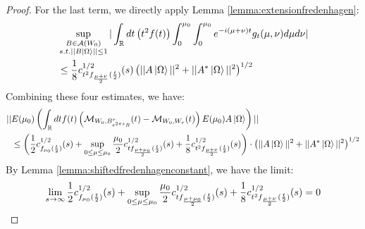 \documentclass[a4paper,11pt]{article}
\theoremstyle{definition}
\newcommand{\lb}{\left(}
\newcommand{\rb}{\right)}
\begin{document}
\begin{proof}
    For the last term, we directly apply Lemma \ref{lemma:extensionfredenhagen}:
    \begin{align}
        \begin{split}
            &\sup_{\substack{B\in\mathcal{A}(W_0)\\s.t.||B\ket{\Omega}||\leq 1}}|\int_\mathbb{R} dt \lb t^2f(t) \rb\int_0^{\mu_0}\int_0^{\mu_0}e^{-i(\mu + \nu)t}g_t(\mu,\nu)d\mu d\nu|
            \\&
            \leq \frac{1}{8}c_{t^2f_{\frac{\mu + \nu}{2}}(\frac{t}{2})}^{1/2}(s)\lb||A\ket{\Omega}||^2 + ||A^*\ket{\Omega}||^2\rb^{1/2}
        \end{split}
    \end{align}
    Combining these four estimates, we have:
    \begin{align}
        \begin{split}
            ||&E(\mu_0)\lb\int_\mathbb{R} dt f(t)\lb \mathcal{M}_{W_0, B^r_{e^{2\pi s}R}}(t) - \mathcal{M}_{W_0, W_r}(t) \rb E(\mu_0)A\ket{\Omega}\rb||
            \\&
            \leq \lb \frac{1}{2}c^{1/2}_{f_{\mu_0}(\frac{t}{2})}(s) + \sup_{0\leq\mu\leq\mu_0}\frac{\mu_0}{2} c^{1/2}_{tf_{\frac{\mu + \mu_0}{2}}(\frac{t}{2})}(s) + \frac{1}{8}c^{1/2}_{t^2f_{\frac{\mu + \nu}{2}}(\frac{t}{2})}(s)\rb\cdot\lb||A\ket{\Omega}||^2 + ||A^*\ket{\Omega}||^2\rb^{1/2}
        \end{split}
    \end{align}
    By Lemma \ref{lemma:shiftedfredenhagenconstant}, we have the limit:
    \begin{equation}
        \lim_{s\rightarrow\infty}\frac{1}{2}c^{1/2}_{f_{\mu_0}(\frac{t}{2})}(s) + \sup_{0\leq\mu\leq\mu_0}\frac{\mu_0}{2} c^{1/2}_{tf_{\frac{\mu + \mu_0}{2}}(\frac{t}{2})}(s) + \frac{1}{8}c^{1/2}_{t^2f_{\frac{\mu + \nu}{2}}(\frac{t}{2})}(s) = 0\qedhere
    \end{equation}
\end{proof}
\end{document}
